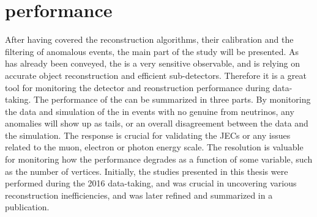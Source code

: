 \section{\ptmiss performance}
After having covered the \ptmiss reconstruction algorithms, their calibration and the filtering of anomalous \ptmiss events, the main part of the study will be presented. 
As has already been conveyed, the \ptmiss is a very sensitive observable, and is relying on accurate object reconstruction and efficient sub-detectors. 
Therefore it is a great tool for monitoring the detector and reonstruction performance during data-taking. 
The performance of the \ptmiss can be summarized in three parts. 
By monitoring the data and simulation of the \ptmiss in events with no genuine \ptmiss from neutrinos, any anomalies will show up as \ptmiss tails, or an overall disagreement between the data and the simulation. 
The \ptmiss response is crucial for validating the JECs or any issues related to the muon, electron or photon energy scale. 
The \ptmiss resolution is valuable for monitoring how the performance degrades as a function of some variable, such as the number of vertices. 
Initially, the studies presented in this thesis were performed during the 2016 data-taking, and was crucial in uncovering various reconstruction inefficiencies, and was later refined and summarized in a publication.  
